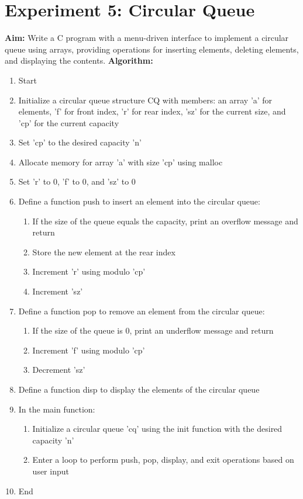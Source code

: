 \documentclass{article}
\begin{document}
\clearpage
\section{Experiment 5: Circular Queue}
\textbf{Aim:} Write a C program with a menu-driven interface to implement a circular queue using arrays, providing operations for inserting elements, deleting elements, and displaying the contents.
\textbf{Algorithm:}
\begin{enumerate}
  \item Start
  \item Initialize a circular queue structure CQ with members: an array 'a' for elements, 'f' for front index, 'r' for rear index, 'sz' for the current size, and 'cp' for the current capacity
  \item Set 'cp' to the desired capacity 'n'
  \item Allocate memory for array 'a' with size 'cp' using malloc
  \item Set 'r' to 0, 'f' to 0, and 'sz' to 0
  \item Define a function push to insert an element into the circular queue:
    \begin{enumerate}
      \item If the size of the queue equals the capacity, print an overflow message and return
      \item Store the new element at the rear index
      \item Increment 'r' using modulo 'cp'
      \item Increment 'sz'
    \end{enumerate}
  \item Define a function pop to remove an element from the circular queue:
    \begin{enumerate}
      \item If the size of the queue is 0, print an underflow message and return
      \item Increment 'f' using modulo 'cp'
      \item Decrement 'sz'
    \end{enumerate}
  \item Define a function disp to display the elements of the circular queue
  \item In the main function:
    \begin{enumerate}
      \item Initialize a circular queue 'cq' using the init function with the desired capacity 'n'
      \item Enter a loop to perform push, pop, display, and exit operations based on user input
    \end{enumerate}
  \item End
\end{enumerate}
\end{document}
